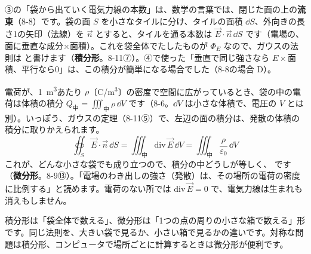 \begin{phmodel}[止まった電荷の電場と電位]
\end{phmodel}

\phkokomade


\label{ph:電-2:sec8}
③の「袋から出ていく電気力線の本数」は、数学の言葉では、閉じた面の上の\textbf{流束}（8-8）です。袋の面 $S$ を小さなタイルに分け、タイルの面積 $\dd S$、外向きの長さ1の矢印（法線）を $\vec n$ とすると、タイルを通る本数は $\vec E\cdot\vec n\,\dd S$ です（電場の、面に垂直な成分×面積）。これを袋全体でたしたものが $\Phi_E$ なので、ガウスの法則は
\label{ph:電-2:sekibun}と書けます（\textbf{積分形}。8-11⑦）。④で使った「垂直で同じ強さなら $E\times$面積、平行なら0」は、この積分が簡単になる場合でした（8-8の場合 D）。

電荷が、\qty{1}{m^3}あたり $\rho$〔C/m$^3$〕の密度で空間に広がっているとき、袋の中の電荷は体積の積分 $Q_{\text{中}}=\iiint_{\text{中}}\rho\,\dd V$ です（8-6。$\dd V$ は小さな体積で、電圧の $V$ とは別）。いっぽう、ガウスの定理（8-11⑤）で、左辺の面の積分は、発散の体積の積分に取りかえられます。
\[\oiint_S\vec E\cdot\vec n\,\dd S=\iiint_{\text{中}}\mathrm{div}\,\vec E\,\dd V=\iiint_{\text{中}}\frac{\rho}{\varepsilon_0}\,\dd V\]
これが、どんな小さな袋でも成り立つので、積分の中どうしが等しく、
\label{ph:電-2:bibun}です（\textbf{微分形}。8-9⑬）。「電場のわき出しの強さ（発散）は、その場所の電荷の密度に比例する」と読めます。電荷のない所では $\mathrm{div}\,\vec E=0$ で、電気力線は生まれも消えもしません。

\begin{phyomi}[$\mathrm{div}\,\vec E=\rho/\varepsilon_0$]
積分形は「袋全体で数える」、微分形は「1つの点の周りの小さな箱で数える」形です。同じ法則を、大きい袋で見るか、小さい箱で見るかの違いです。対称な問題は積分形、コンピュータで場所ごとに計算するときは微分形が便利です。
\end{phyomi}

